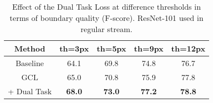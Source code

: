 \documentclass[10pt,twocolumn,letterpaper]{article}
\begin{document}
\begin{table}
\vspace{-2mm}
\begin{minipage}{0.45\textwidth}
\begin{small}
\begin{tabular}{ c|c| c|c|c}
Method & th=3px & th=5px  & th=9px & th=12px  \\
\hline \hline
   Baseline & 64.1 & 69.8  & 74.8   & 76.7  \\
  \hline
   GCL & 65.0 & 70.8  & 75.9  &  77.8  \\
   + Dual Task & \bf{68.0} & \bf{73.0}   &  \bf{77.2} & \bf{78.8} \\
\hline \hline
\end{tabular}
\end{small}
\centering
\vspace{-3mm}
\caption{Effect of the Dual Task Loss at difference thresholds in terms of boundary quality (F-score). ResNet-101 used in regular stream. }
\label{tbl_effect_dual}
\end{minipage}
\vspace{-2mm}
\end{table}

\begin{table}
\vspace{0mm}
\begin{minipage}{0.45\textwidth}
\centering
\vspace{-3mm}
\caption{Performance improvements and the percentage increase in the number of parameters due to the shape stream on different base networks.}
\label{tbl_params}
\end{minipage}
\vspace{-6mm}
\end{table}


\vspace{-4mm}
\end{document}
